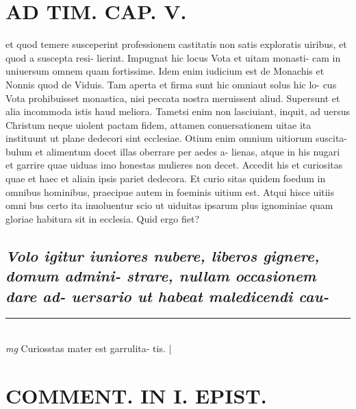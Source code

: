 \documentclass{article}
\begin{document}
\begin{pages}
\section*{AD TIM. CAP. V. }
\marginpar{[ p.154 ]}\pstart et quod temere susceperint professionem castitatis non satis exploratis uiribus, et quod a suscepta resi- lierint. Impugnat hic locus Vota et uitam monasti- cam in uniuersum omnem quam fortissime. Idem enim iudicium est de Monachis et Nonnis quod de Viduis. Tam aperta et firma sunt hic omniaut solus hic lo- cus Vota prohibuisset monastica, nisi peccata nostra meruissent aliud. Supersunt et alia incommoda istis haud meliora. Tametsi enim non lasciuiant, inquit, ad uersus Christum neque uiolent pactam fidem, attamen conuersationem uitae ita instituunt ut plane dedecori sint ecclesiae. Otium enim omnium uitiorum suscita- bulum et alimentum docet illas oberrare per aedes a- lienas, atque in his nugari et garrire quae uiduas imo honestas mulieres non decet. Accedit his et curiositas quae et haec et aliain ipsis pariet dedecora. Et curio sitas quidem foedum in omnibus hominibus, praecipue autem in foeminis uitium est. Atqui hisce uitiis omni bus certo ita inuoluentur scio ut uiduitas ipsarum plus ignominiae quam gloriae habitura sit in ecclesia. Quid ergo fiet?  \pend
{}
{}
\subsection*{\textit{Volo igitur iuniores nubere, liberos gignere, domum admini- strare, nullam occasionem dare ad- uersario ut habeat maledicendi cau- }}
\vspace{0.5cm}\noindent
\vspace{0.2cm}\rule{1cm}{0.2pt}\\ 
\hspace{0.2cm}\textit{mg}
\footnotesize Curiosstas mater est garrulita- tis. 
\normalsize| 
\section*{COMMENT. IN I. EPIST. }
{}

\end{pages}
\end{document}
